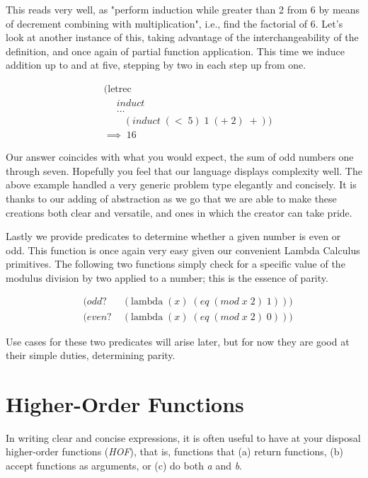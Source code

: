 This reads very well, as "perform induction while greater than 2 from 6 by means 
of decrement combining with multiplication", i.e., find the factorial of 6. Let's 
look at another instance of this, taking advantage of the interchangeability of 
the definition, and once again of partial function application. This time we 
induce addition up to and at five, stepping by two in each step up from one.

\begin{figure}[ht]
\caption{}\label{scheme}
\begin{align*}
& (\text{letrec} \; 
\\& \quad \; induct \; 
\\& \quad \; \dots
\\& \qquad (induct \; (< \; 5) \; 1 \; (+ \; 2) \; +))
\\& \implies \; 16
\end{align*}
\end{figure}

Our answer coincides with what you would expect, the sum of odd numbers one 
through seven. Hopefully you feel that our language displays complexity well. The 
above example handled a very generic problem type elegantly and concisely. It is 
thanks to our adding of abstraction as we go that we are able to make these 
creations both clear and versatile, and ones in which the creator can take pride.

Lastly we provide predicates to determine whether a given number is even or odd. 
This function is once again very easy given our convenient Lambda Calculus 
primitives. The following two functions simply check for a specific value of the 
modulus division by two applied to a number; this is the essence of parity.

\begin{figure}[ht]
\caption{}\label{scheme}
\begin{align*}
& (odd? \; &(\text{lambda} \; (x) \; (eq \; (mod \; x \; 2) \; 1)))
\\& (even? \; &(\text{lambda} \; (x) \; (eq \; (mod \; x \; 2) \; 0)))
\end{align*}
\end{figure}

Use cases for these two predicates will arise later, but for now they are good at 
their simple duties, determining parity.

\section{Higher-Order Functions}
In writing clear and concise expressions, it is often useful to have at your 
disposal higher-order functions (\emph{HOF}), that is, functions that (a) return 
functions, (b) accept functions as arguments, or (c) do both \emph{a} and \emph{b}.

